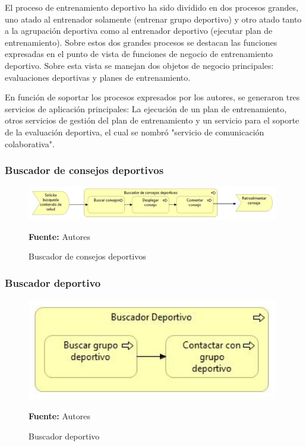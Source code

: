 El proceso de entrenamiento deportivo ha sido dividido en dos procesos grandes, uno atado al entrenador solamente (entrenar grupo deportivo) y otro atado tanto a la agrupación deportiva como al entrenador deportivo (ejecutar plan de entrenamiento). Sobre estos dos grandes procesos se destacan las funciones expresadas en el punto de vista de funciones de negocio de entrenamiento deportivo. Sobre esta vista se manejan dos objetos de negocio principales: evaluaciones deportivas y planes de entrenamiento.

En función de soportar los procesos expresados por los autores, se generaron tres servicios de aplicación principales: La ejecución de un plan de entrenamiento, otros servicios de gestión del plan de entrenamiento y un servicio para el soporte de la evaluación deportiva, el cual se nombró "servicio de comunicación colaborativa".

\subsubsection{Buscador de consejos deportivos}

\begin{figure}[!htb]
  \begin{center}
    \includegraphics[width=11cm]{./imagenes/business_process/buscadorconsejosdeportivos.png}
    \caption{Buscador de consejos deportivos}
    \label{fig:BP_BuscadorConsejosDeportivos}
    \textbf{Fuente:}  Autores
  \end{center}
\end{figure}

\subsubsection{Buscador deportivo}

\begin{figure}[!htb]
  \begin{center}
    \includegraphics[width=11cm]{./imagenes/business_process/buscadordeportivo.png}
    \caption{Buscador deportivo}
    \label{fig:BP_BuscadorDeportivo}
    \textbf{Fuente:}  Autores
  \end{center}
\end{figure}

